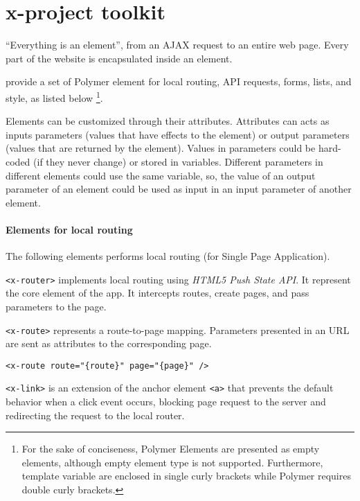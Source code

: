 \section{x-project toolkit}\label{sec:toolkit}

``Everything is an element'', from an AJAX request to an entire web page. Every part of the website is encapsulated inside an element. 

 provide a set of Polymer element for local routing, API requests, forms, lists, and style, as listed below \footnote{\scriptsize For the sake of conciseness, Polymer Elements are presented as empty elements, although empty element type is not supported. Furthermore, template variable are enclosed in single curly brackets while Polymer requires double curly brackets.}. 

Elements can be customized through their attributes. Attributes can acts as inputs parameters (values that have effects to the element) or output parameters (values that are returned by the element).
Values in parameters could be hard-coded (if they never change) or stored in variables.
Different parameters in different elements could use the same variable, so, the value of an output parameter of an element could be used as input in an input parameter of another element.

\paragraph{Elements for local routing}

The following elements performs local routing (for Single Page Application).

\vspace{0.2cm}

\texttt{<x-router>} implements local routing using \emph{HTML5 Push State API}. It represent the core element of the app. It intercepts routes, create pages, and pass parameters to the page.

\vspace{0.2cm}

\texttt{<x-route>} represents a route-to-page mapping. 
Parameters presented in an URL are sent as attributes to the corresponding page.

\begin{lstlisting}[language=HTML5]
<x-route route="{route}" page="{page}" />
\end{lstlisting}

\texttt{<x-link>} is an extension of the anchor element \texttt{<a>} that prevents the default behavior when a click event occurs, blocking page request to the server and redirecting the request to the local router. 

